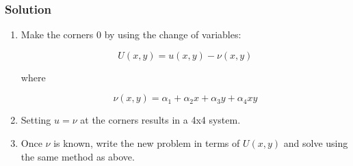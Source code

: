 \documentclass[11pt]{article}
\begin{document}
\subsubsection*{Solution}
\begin{enumerate}

\item Make the corners 0 by using the change of variables:

$$ U(x,y) = u(x,y) - \nu(x,y) $$

where

$$ \nu(x,y) = \alpha_1 +\alpha_2x + \alpha_3y + \alpha_4xy $$

\item Setting $u=\nu$ at the corners results in a 4x4 system. 

\item Once $\nu$ is known, write the new problem in terms of $U(x,y)$ and solve using the same method as above.

\end{enumerate}
 
\end{document}
